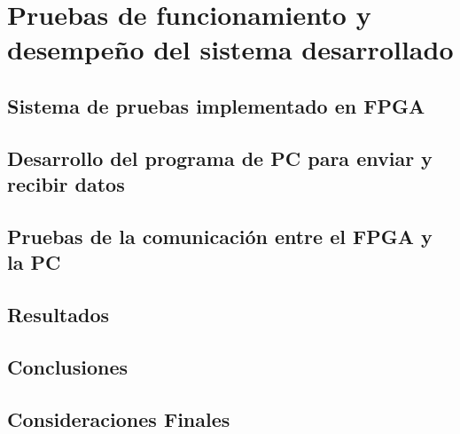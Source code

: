 \chapter{Pruebas de funcionamiento y desempeño del sistema desarrollado}
	\label{cap:verif}
	
%		
	\section{Sistema de pruebas implementado en FPGA}
		
	\section{Desarrollo del programa de PC para enviar y recibir datos}
			
	\section{Pruebas de la comunicación entre el FPGA y la PC}
		
	\section{Resultados}
		
	\section{Conclusiones}
		
	\section{Consideraciones Finales}
		